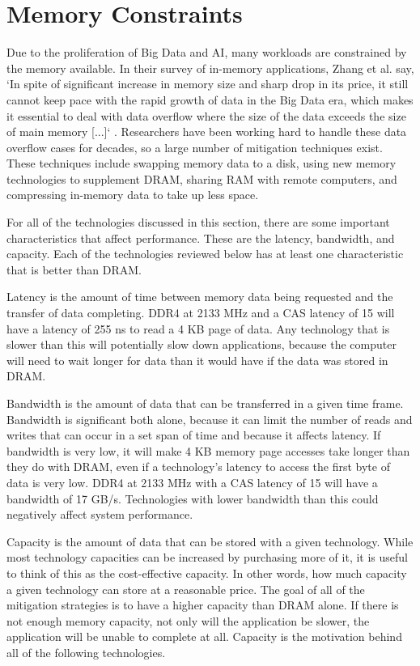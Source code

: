 \documentclass[doublespace,nopageskip]{VTthesis}
\begin{document}
\section{Memory Constraints}\label{se:memory_constraints}
Due to the proliferation of Big Data and AI, many workloads are constrained by the memory available. In their survey of in-memory applications, Zhang et al. say, `In spite of significant increase in memory size and sharp drop in its price, it still cannot keep pace with the rapid growth of data in the Big Data era, which makes it essential to deal with data overflow where the size of the data exceeds the size of main memory [...]` \cite{inmemorybigdata}. Researchers have been working hard to handle these data overflow cases for decades, so a large number of mitigation techniques exist. These techniques include swapping memory data to a disk, using new memory technologies to supplement DRAM, sharing RAM with remote computers, and compressing in-memory data to take up less space.

For all of the technologies discussed in this section, there are some important characteristics that affect performance. These are the latency, bandwidth, and capacity. Each of the technologies reviewed below has at least one characteristic that is better than DRAM.

Latency is the amount of time between memory data being requested and the transfer of data completing. DDR4 at 2133 MHz and a CAS latency of 15 will have a latency of 255 ns to read a 4 KB page of data. Any technology that is slower than this will potentially slow down applications, because the computer will need to wait longer for data than it would have if the data was stored in DRAM.

Bandwidth is the amount of data that can be transferred in a given time frame. Bandwidth is significant both alone, because it can limit the number of reads and writes that can occur in a set span of time and because it affects latency. If bandwidth is very low, it will make 4 KB memory page accesses take longer than they do with DRAM, even if a technology's latency to access the first byte of data is very low. DDR4 at 2133 MHz with a CAS latency of 15 will have a bandwidth of 17 GB/s. Technologies with lower bandwidth than this could negatively affect system performance.

Capacity is the amount of data that can be stored with a given technology. While most technology capacities can be increased by purchasing more of it, it is useful to think of this as the cost-effective capacity. In other words, how much capacity a given technology can store at a reasonable price. The goal of all of the mitigation strategies is to have a higher capacity than DRAM alone. If there is not enough memory capacity, not only will the application be slower, the application will be unable to complete at all. Capacity is the motivation behind all of the following technologies.
\end{document}
